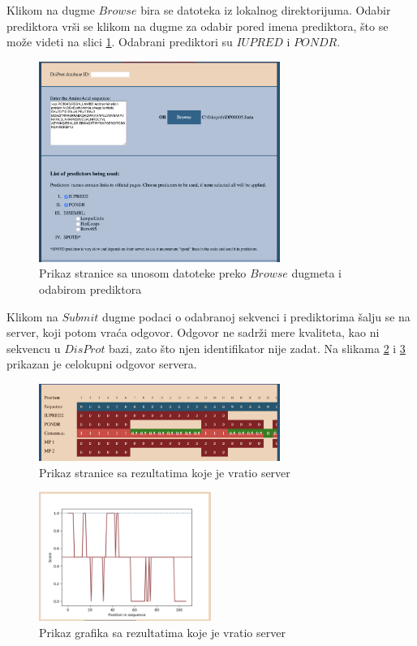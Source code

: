 Klikom na dugme $Browse$ bira se datoteka iz lokalnog direktorijuma. Odabir prediktora vrši se klikom na dugme za odabir pored imena prediktora, što se može videti na slici \ref{fig:DP51}. Odabrani prediktori su $IUPRED$ i $PONDR$.

\begin{figure}[H]
	\centering
    \includegraphics[width=0.7\textwidth]{Figures/App/DP00005/first_screen.png}
    \caption{Prikaz stranice sa unosom datoteke preko $Browse$ dugmeta i odabirom prediktora}
    \label{fig:DP51}
\end{figure}

Klikom na $Submit$ dugme podaci o odabranoj sekvenci i prediktorima šalju se na server, koji potom vraća odgovor. Odgovor ne sadrži mere kvaliteta, kao ni sekvencu u $DisProt$ bazi, zato što njen identifikator nije zadat. Na slikama \ref{fig:DP52} i \ref{fig:DP53} prikazan je celokupni odgovor servera.

\begin{figure}[H]
	\centering
    \includegraphics[width=0.7\textwidth]{Figures/App/DP00005/second_screen.png}
    \caption{Prikaz stranice sa rezultatima koje je vratio server}
    \label{fig:DP52}
\end{figure}

\begin{figure}[H]
	\centering
    \includegraphics[width=0.5\textwidth]{Figures/App/DP00005/third_screen.png}
    \caption{Prikaz grafika sa rezultatima koje je vratio server}
    \label{fig:DP53}
\end{figure}

